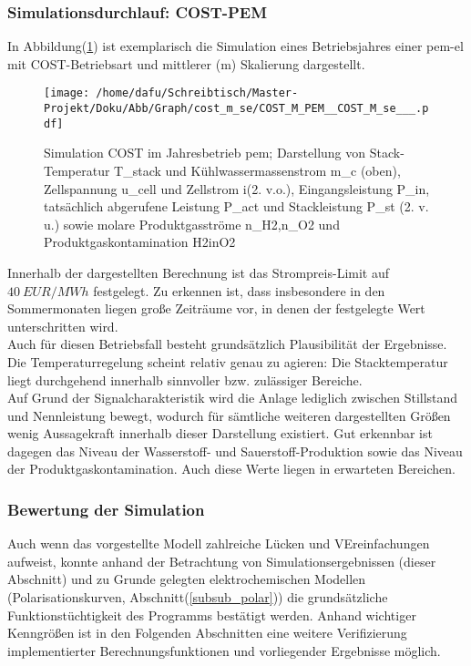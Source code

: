 \documentclass[onecolumn,10pt,titlepage]{article}
\begin{document}
\subsubsection{Simulationsdurchlauf: COST-PEM}
In Abbildung(\ref{fig:plt_se_COST_PEM}) ist exemplarisch die Simulation eines Betriebsjahres einer \gls{pem}-\gls{el} mit COST-Betriebsart und mittlerer (m) Skalierung dargestellt.
\begin{figure}[H]

	\centering
	\texttt{[image: /home/dafu/Schreibtisch/Master-Projekt/Doku/Abb/Graph/cost\_m\_se/COST\_M\_PEM\_\_COST\_M\_se\_\_\_.pdf]}

	\caption[Simulation COST im Jahresbetrieb \gls{pem}]{Simulation COST im Jahresbetrieb \gls{pem}; Darstellung von Stack-Temperatur \gls{T_stack} und Kühlwassermassenstrom \gls{m_c} (oben), Zellspannung \gls{u_cell} und Zellstrom \gls{i}(2. v.o.), Eingangsleistung \gls{P_in},  tatsächlich abgerufene Leistung \gls{P_act} und Stackleistung \gls{P_st} (2. v. u.) sowie molare Produktgasströme \gls{n_H2},\gls{n_O2} und Produktgaskontamination \gls{H2inO2}}
	\label{fig:plt_se_COST_PEM}
\end{figure}
Innerhalb der dargestellten Berechnung ist das Strompreis-Limit auf $40~ EUR/MWh$ festgelegt. Zu erkennen ist, dass insbesondere in den Sommermonaten liegen große Zeiträume vor, in denen der festgelegte Wert unterschritten wird.\\
Auch für diesen Betriebsfall besteht grundsätzlich Plausibilität der Ergebnisse. Die Temperaturregelung scheint relativ genau zu agieren: Die Stacktemperatur liegt durchgehend innerhalb sinnvoller bzw. zulässiger Bereiche.\\
Auf Grund der Signalcharakteristik wird die Anlage lediglich zwischen Stillstand und Nennleistung bewegt, wodurch für sämtliche weiteren dargestellten Größen wenig Aussagekraft innerhalb dieser Darstellung existiert. Gut erkennbar ist dagegen das Niveau der Wasserstoff- und Sauerstoff-Produktion sowie das Niveau der Produktgaskontamination. Auch diese Werte liegen in erwarteten Bereichen.\\
\subsubsection{Bewertung der Simulation}
Auch wenn das vorgestellte Modell zahlreiche Lücken und VEreinfachungen aufweist, konnte anhand der Betrachtung von Simulationsergebnissen (dieser Abschnitt) und zu Grunde gelegten elektrochemischen Modellen (Polarisationskurven, Abschnitt(\ref{subsub_polar})) die grundsätzliche Funktionstüchtigkeit des Programms bestätigt werden. Anhand wichtiger Kenngrößen ist in den Folgenden Abschnitten eine weitere Verifizierung implementierter Berechnungsfunktionen und vorliegender Ergebnisse möglich.
\end{document}
